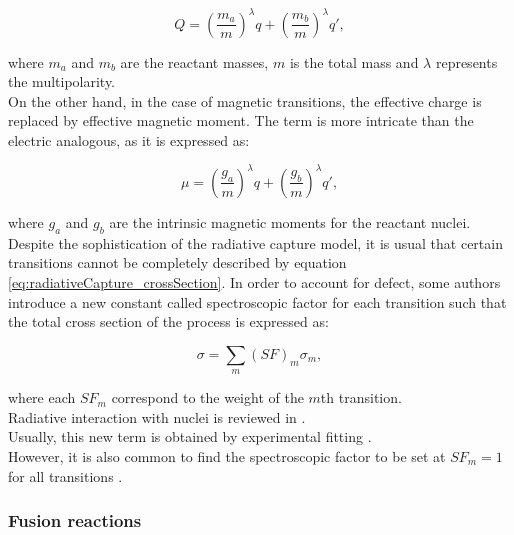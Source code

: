 \documentclass[openany]{book}
\begin{document}
\begin{equation} \label{eq:radiativeCapture_Electric_charge}
	Q =  \left(\frac{m_a}{m}\right)^{\lambda}q + \left(\frac{m_b}{m}\right)^{\lambda}q',
\end{equation}

where $m_a$ and $m_b$ are the reactant masses, $m$ is the total mass and $\lambda$ represents the multipolarity. \\

On the other hand, in the case of magnetic transitions, the effective charge is replaced by effective magnetic moment.
The term is more intricate than the electric analogous, as it is expressed as: 

\begin{equation} \label{eq:radiativeCapture_Magnetic_moment}
	\mu =  \left(\frac{g_a}{m}\right)^{\lambda}q + \left(\frac{g_b}{m}\right)^{\lambda}q',
\end{equation}

where $g_a$ and $g_b$ are the intrinsic magnetic moments for the reactant nuclei. \\

Despite the sophistication of the radiative capture model, it is usual that certain transitions cannot be completely described by equation \ref{eq:radiativeCapture_crossSection}. In order to account for defect, some authors introduce a new constant called spectroscopic factor for each transition such that the total cross section of the process is expressed as: 

\begin{equation}  \label{eq:radiativeCapture_crossSection_SF}
	\sigma = \sum_{m}{{(SF)}_m\sigma_m},		
\end{equation}

where each ${SF}_m$ correspond to the weight of the $m$th transition. \\ 

Radiative interaction with nuclei is reviewed in \cite{blatt_weisskopf_1952}. \\

Usually, this new term is obtained by experimental fitting \cite{kabir_nabi_2021, xu_takahashi_goriely_arnould_ohta_utsunomiya_2013}. \\

However, it is also common to find the spectroscopic factor to be set at $SF_m = 1$ for all transitions \cite{bertulani_1996}. \\

\subsubsection{Fusion reactions} \label{ssub:potential_calculations_fusion}
\end{document}
